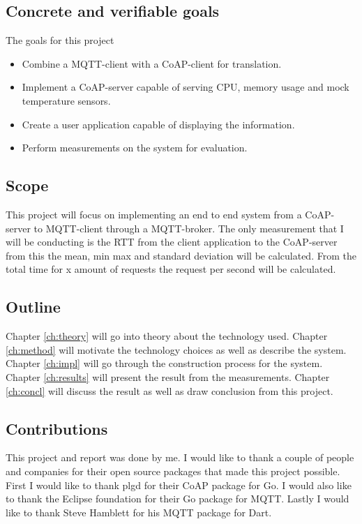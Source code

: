 \subsection{Concrete and verifiable goals}
\label{ch:intro:verifiable-goals}
The goals for this project
\begin{itemize}
    \item Combine a MQTT-client with a CoAP-client for translation.
    \item Implement a CoAP-server capable of serving CPU, memory usage and mock temperature sensors.
    \item Create a user application capable of displaying the information.
    \item Perform measurements on the system for evaluation.
\end{itemize}

\subsection{Scope}
\label{ch:intro:scope}
This project will focus on implementing an end to end system from a CoAP-server to MQTT-client through a MQTT-broker. The only measurement that I will be conducting is the RTT from the client application to the CoAP-server from this the mean, min max and standard deviation will be calculated. From the total time for x amount of requests the request per second will be calculated.

\subsection{Outline}
\label{ch:intro:outline}
Chapter \ref{ch:theory} will go into theory about the technology used. Chapter \ref{ch:method} will motivate the technology choices as well as describe the system. Chapter \ref{ch:impl} will go through the construction process for the system. Chapter \ref{ch:results} will present the result from the measurements. Chapter \ref{ch:concl} will discuss the result as well as draw conclusion from this project.

\subsection{Contributions}
\label{ch:intro:contributions}
This project and report was done by me.
I would like to thank a couple of people and companies for their open source packages that made this project possible.
First I would like to thank plgd for their CoAP package for Go.
I would also like to thank the Eclipse foundation for their Go package for MQTT.
Lastly I would like to thank Steve Hamblett for his MQTT package for Dart.
